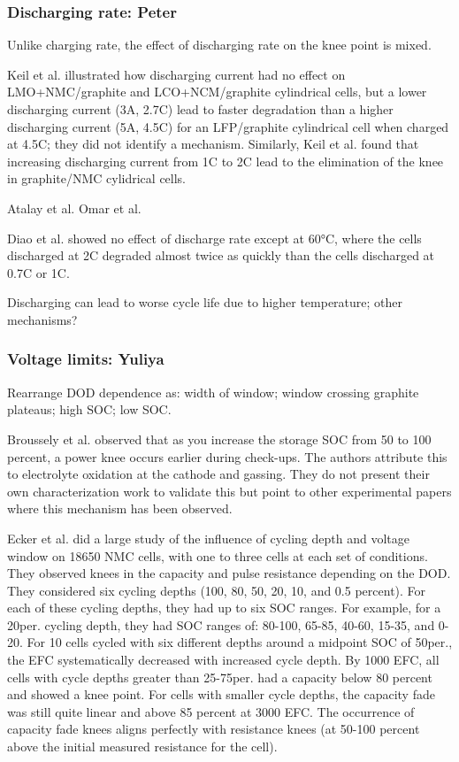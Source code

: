 \documentclass{article}
\begin{document}
\subsubsection{Discharging rate: Peter}

Unlike charging rate, the effect of discharging rate on the knee point is mixed.

Keil et al.\cite{keil_charging_2016} illustrated how discharging current had no effect on LMO+NMC/graphite and LCO+NCM/graphite cylindrical cells, but a lower discharging current (3A, 2.7C) lead to faster degradation than a higher discharging current (5A, 4.5C) for an LFP/graphite cylindrical cell when charged at 4.5C; they did not identify a mechanism. 
Similarly, Keil et al.\cite{keil_linear_2019} found that increasing discharging current from 1C to 2C lead to the elimination of the knee in graphite/NMC cylidrical cells.

Atalay et al.\cite{atalay_theory_2020}
Omar et al.

Diao et al.\cite{diao_accelerated_2019} showed no effect of discharge rate except at 60°C, where the cells discharged at 2C degraded almost twice as quickly than the cells discharged at 0.7C or 1C. 

Discharging can lead to worse cycle life due to higher temperature; other mechanisms?

\subsubsection{Voltage limits: Yuliya}  
Rearrange DOD dependence as: width of window; window crossing graphite plateaus; high SOC; low SOC.

Broussely et al. \cite{broussely_main_2005} observed that as you increase the storage SOC from 50 to 100 percent, a power knee occurs earlier during check-ups. The authors attribute this to electrolyte oxidation at the cathode and gassing. They do not present their own characterization work to validate this but point to other experimental papers where this mechanism has been observed.

Ecker et al. \cite{ecker_calendar_2014} did a large study of the influence of cycling depth and voltage window on 18650 NMC cells, with one to three cells at each set of conditions. They observed knees in the capacity and pulse resistance depending on the DOD. They considered six cycling depths (100, 80, 50, 20, 10, and 0.5 percent). For each of these cycling depths, they had up to six SOC ranges. For example, for a 20per. cycling depth, they had SOC ranges of: 80-100, 65-85, 40-60, 15-35, and 0-20. For 10 cells cycled with six different depths around a midpoint SOC of 50per., the EFC systematically decreased with increased cycle depth. By 1000 EFC, all cells with cycle depths greater than 25-75per. had a capacity below 80 percent and showed a knee point. For cells with smaller cycle depths, the capacity fade was still quite linear and above 85 percent at 3000 EFC. The occurrence of capacity fade knees aligns perfectly with resistance knees (at 50-100 percent above the initial measured resistance for the cell). 
\end{document}
